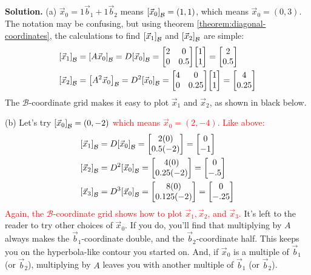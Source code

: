 \documentclass[11pt, letterpaper]{report}
\newenvironment{book}{}{}
\let\originalleft\left
\let\originalright\right
\renewcommand{\left}{\mathopen{}\mathclose\bgroup\originalleft}
\renewcommand{\right}{\aftergroup\egroup\originalright}
\newcounter{theorem}[chapter]
\newcommand{\bbvec}[2]{
  \begin{bmatrix} #1 \\ #2 \end{bmatrix}
}
\begin{document}
\begin{book}
\textbf{Solution.} (a) $\vec{x}_0=1\vec{b}_1+1\vec{b}_2$ means $\left[ \vec{x}_0 \right]_{\mathcal{B}} = (1,1)$, which means $\vec{x}_0=(0,3)$. The notation may be confusing, but using theorem \ref{theorem:diagonal-coordinates}, the calculations to find $\left[ \vec{x}_1 \right]_{\mathcal{B}}$ and $\left[ \vec{x}_2 \right]_{\mathcal{B}}$ are simple:
\begin{align*}
\left[ \vec{x}_1 \right]_{\mathcal{B}} &= \left[ A\vec{x}_0 \right]_{\mathcal{B}} =
D\left[ \vec{x}_0 \right]_{\mathcal{B}} = \begin{bmatrix}
2 & 0 \\
0 & 0.5
\end{bmatrix}\bbvec{1}{1} = \bbvec{2}{0.5} \\
\left[ \vec{x}_2 \right]_{\mathcal{B}} &= \left[ A^2\vec{x}_0 \right]_{\mathcal{B}} =
D^2\left[ \vec{x}_0 \right]_{\mathcal{B}} = \begin{bmatrix}
4 & 0 \\
0 & 0.25
\end{bmatrix}\bbvec{1}{1} = \bbvec{4}{0.25}
\end{align*}
The $\mathcal{B}$-coordinate grid makes it easy to plot $\vec{x}_1$ and $\vec{x}_2$, as shown in black below.

(b) Let's try \textcolor{red}{$\left[ \vec{x}_0 \right]_{\mathcal{B}} = (0,-2)$ which means $\vec{x}_0=(2,-4).$ Like above:
\begin{align*}
\left[ \vec{x}_1 \right]_{\mathcal{B}} &= 
D\left[ \vec{x}_0 \right]_{\mathcal{B}} = \bbvec{2(0)}{0.5(-2)} = \bbvec{0}{-1} \\
\left[ \vec{x}_2 \right]_{\mathcal{B}} &= 
D^2\left[ \vec{x}_0 \right]_{\mathcal{B}} = \bbvec{4(0)}{0.25(-2)} = \bbvec{0}{-.5} \\
\left[ \vec{x}_3 \right]_{\mathcal{B}} &= 
D^3\left[ \vec{x}_0 \right]_{\mathcal{B}} = \bbvec{8(0)}{0.125(-2)} = \bbvec{0}{-.25} 
\end{align*}
Again, the $\mathcal{B}$-coordinate grid shows how to plot $\vec{x}_1, \vec{x}_2$, and $\vec{x}_3$.}
It's left to the reader to try other choices of $\vec{x}_0$. If you do, you'll find that multiplying by $A$ always makes the $\vec{b}_1$-coordinate double, and the $\vec{b}_2$-coordinate half. This keeps you on the hyperbola-like contour you started on. And, if $\vec{x}_0$ is a multiple of $\vec{b}_1$ (or $\vec{b}_2$), multiplying by $A$ leaves you with another multiple of $\vec{b}_1$ (or $\vec{b}_2$).


\end{book}
\end{document}
